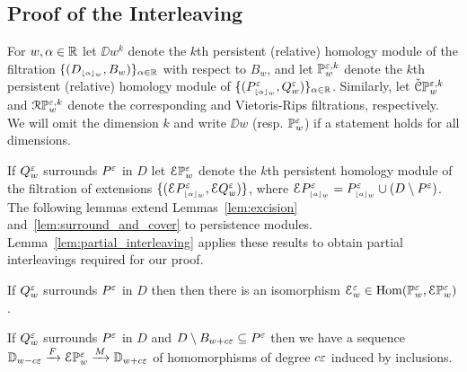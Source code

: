 


\subsection{Proof of the Interleaving}

For $w,\alpha\in\R$ let $\DD{w}^k$ denote the $k$th persistent (relative) homology module of the filtration $\{(D\subi{w}{\alpha},B_w)\}_{\alpha\in\R}$ with respect to $B_w$, and let $\PP{w}{\e,k}$ denote the $k$th persistent (relative) homology module of $\{(P\subi{w}{\alpha}^\e,Q_w^\e)\}_{\alpha\in\R}$.
Similarly, let $\CPP{w}{\e,k}$ and $\RPP{w}{\e,k}$ denote the corresponding \Cech and Vietoris-Rips filtrations, respectively.
We will omit the dimension $k$ and write $\DD{w}$ (resp. $\PP{w}{\e}$) if a statement holds for all dimensions.

If $Q_w^\e$ surrounds $P^\e$ in $D$ let $\ext{\PP{w}{\e}}$ denote the $k$th persistent homology module of the filtration of extensions $\{(\ext{P\subi{w}{\alpha}^\e},\ext{Q_w^\e})\}$, where $\ext{P\subi{w}{a}^\e} = P\subi{w}{a}^\e \cup (D\setminus P^\e)$.
The following lemmas extend Lemmas~\ref{lem:excision} and~\ref{lem:surround_and_cover} to persistence modules.
Lemma~\ref{lem:partial_interleaving} applies these results to obtain partial interleavings required for our proof.

\begin{lemma}\label{lem:extension_apply}
  If $Q_w^\e$ surrounds $P^\e$ in $D$ then then there is an isomorphism $\E_w^\e \in \Hom(\PP{w}{\e},\ext{\PP{w}{\e}})$.
\end{lemma}

\begin{lemma}\label{lem:p_interleave}
 If $Q_w^\e$ surrounds $P^\e$ in $D$ and $D\setminus B_{w + c\e}\subseteq P^\e$ then we have a sequence $\DD{w-c\e}\xrightarrow{F}\E\PP{w}{\e}\xrightarrow{M}\DD{w+c\e}$ of homomorphisms of degree $c\e$ induced by inclusions.
\end{lemma}


